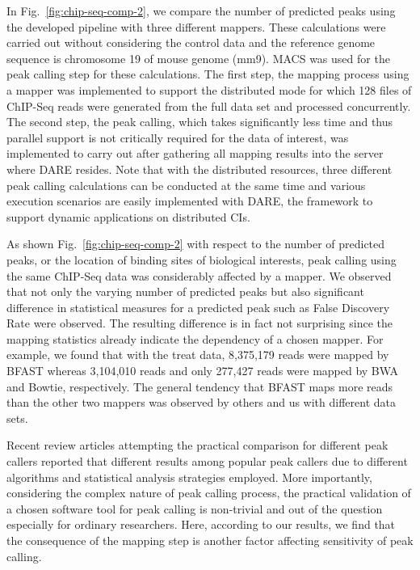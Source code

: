 \documentclass{cpeauth}
\begin{document}
In Fig.~\ref{fig:chip-seq-comp-2}, we compare the number of predicted peaks using the developed pipeline with three different mappers.  These calculations were carried out without considering the control data and the reference genome sequence is chromosome 19 of mouse genome (mm9).  MACS was used for the peak calling step for these calculations.  The first step, the mapping process using a mapper was implemented to support the distributed mode for which 128 files of ChIP-Seq reads were generated from the full data set and processed concurrently. The second step, the peak calling, which takes significantly less time and thus parallel support is not critically required for the data of interest, was implemented to carry out after gathering all mapping results into the server where DARE resides.  Note that with the distributed resources, three different peak calling calculations can be conducted at the same time and various execution scenarios are easily implemented with DARE, the framework to support dynamic applications on distributed CIs.  

As shown Fig.~\ref{fig:chip-seq-comp-2} with respect to the number of predicted peaks, or the location of binding sites of biological interests,  peak calling using the same ChIP-Seq data was considerably affected by a mapper.  We observed that not only the varying number of predicted peaks but also significant difference in statistical measures for a predicted peak such as False Discovery Rate were observed.  The resulting difference is in fact not surprising since the mapping statistics already indicate the dependency of a chosen mapper.   For example, we found that with the treat data, 8,375,179 reads were mapped by BFAST whereas 3,104,010 reads and only 277,427 reads were mapped by BWA and Bowtie, respectively.  The general tendency that BFAST maps more reads than the other two mappers was observed by others and us with different data sets\cite{bfast2009,mapping-survey}.  

Recent review articles attempting the practical comparison for different peak callers reported that different results among popular peak callers due to different algorithms and statistical analysis strategies employed\cite{wilbanks, laajala}.  More importantly, considering the complex nature of peak calling process, the practical validation of a chosen software tool for peak calling is non-trivial and out of the question especially for ordinary researchers.  Here, according to our results, we find that the consequence of the mapping step is another factor affecting sensitivity of peak calling.
\end{document}
